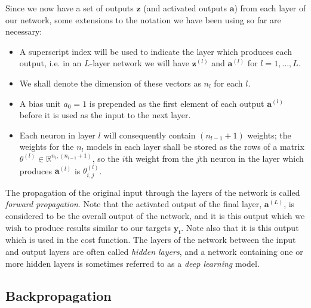 \documentclass{article}[11pt]
\begin{document}
        Since we now have a set of outputs $\mathbf{z}$ (and activated outputs $\mathbf{a}$) from each layer of our network, some extensions to the notation we have been using so far are necessary:
        
        \begin{itemize}
            
            \item A superscript index will be used to indicate the layer which produces each output, i.e. in an $L$-layer network we will have $\mathbf{z}^{(l)}$ and $\mathbf{a}^{(l)}$ for $l = 1, \ldots, L$.
            
            \item We shall denote the dimension of these vectors as $n_l$ for each $l$.
            
            \item A bias unit $a_0 = 1$ is prepended as the first element of each output $\mathbf{a}^{(l)}$ before it is used as the input to the next layer.
            
            \item Each neuron in layer $l$ will consequently contain $(n_{l-1} + 1)$ weights; the weights for the $n_l$ models in each layer shall be stored as the rows of a matrix $\theta^{(l)} \in \mathbb{R}^{n_l, (n_{l-1}+1)}$, so the $i$th weight from the $j$th neuron in the layer which produces $\mathbf{a}^{(l)}$ is $\theta^{(l)}_{i,j}$.
        
        \end{itemize}
        
        The propagation of the original input through the layers of the network is called \textit{forward propagation}. Note that the activated output of the final layer, $\mathbf{a}^{(L)}$, is considered to be the overall output of the network, and it is this output which we wish to produce results similar to our targets $\mathbf{y_i}$. Note also that it is this output which is used in the cost function. The layers of the network between the input and output layers are often called \textit{hidden layers}, and a network containing one or more hidden layers is sometimes referred to as a \textit{deep learning} model.
        
        
    
    \subsection{Backpropagation}
        
\end{document}
